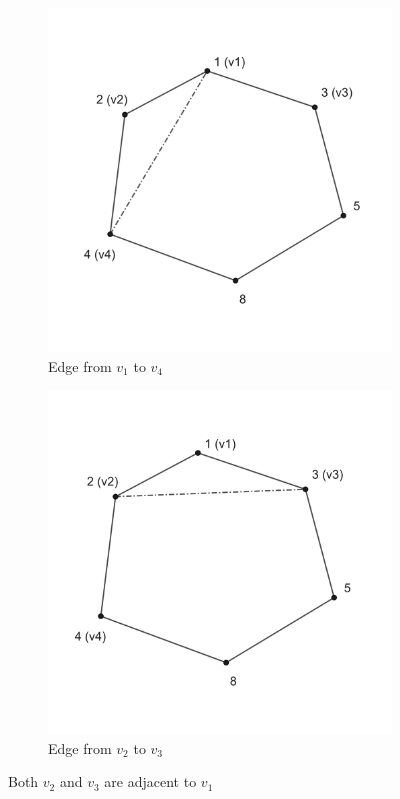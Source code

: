 \documentclass[12pt]{article}
\begin{document}
\begin{figure}
\centering
\begin{subfigure}{.5\textwidth}
  \centering
  \includegraphics[width=\linewidth]{triangulation3a.png}
  \caption{Edge from $v_1$ to $v_4$}
  \label{fig:sub1}
\end{subfigure}%
\begin{subfigure}{.5\textwidth}
  \centering
  \includegraphics[width=\linewidth]{triangulation3b.png}
  \caption{Edge from $v_2$ to $v_3$}
  \label{fig:sub2}
\end{subfigure}
\caption{Both $v_2$ and $v_3$ are adjacent to $v_1$}
\label{fig:test}
\end{figure}
\end{document}
